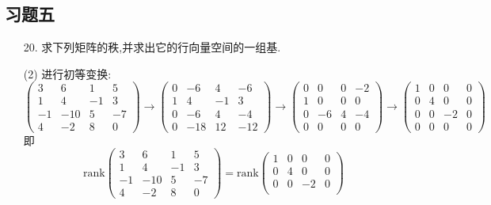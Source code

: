 \documentclass{article}
\begin{document}
\subsection{习题五}
\begin{enumerate}
    \item [20.]求下列矩阵的秩,并求出它的行向量空间的一组基.
    
    (2) 进行初等变换:
    \[
        \begin{pmatrix}
            3  &  6 &  1 &  5\\
            1  &  4 & -1 &  3\\
            -1 & -10&  5 & -7\\
            4  & -2 &  8 &  0
        \end{pmatrix}
        \to
        \begin{pmatrix}
            0 & -6 &  4 & -6\\
            1 &  4 & -1 &  3\\
            0 & -6 &  4 & -4\\
            0 & -18& 12 & -12
        \end{pmatrix}
        \to
        \begin{pmatrix}
            0 &  0 &  0 & -2\\
            1 &  0 &  0 &  0\\
            0 & -6 &  4 & -4\\
            0 &  0 &  0 & 0
        \end{pmatrix}
        \to
        \begin{pmatrix}
            1 & 0 & 0 & 0\\
            0 & 4 & 0 & 0\\
            0 & 0 & -2& 0\\
            0 & 0 & 0 & 0
        \end{pmatrix}
    \]
    即
    \[
        \mbox{rank}
        \begin{pmatrix}
            3  &  6 &  1 &  5\\
            1  &  4 & -1 &  3\\
            -1 & -10&  5 & -7\\
            4  & -2 &  8 &  0
        \end{pmatrix}
        =\mbox{rank}
        \begin{pmatrix}
            1 & 0 & 0 & 0\\
            0 & 4 & 0 & 0\\
            0 & 0 & -2& 0\\

\end{pmatrix}\]
\end{enumerate}
\end{document}
